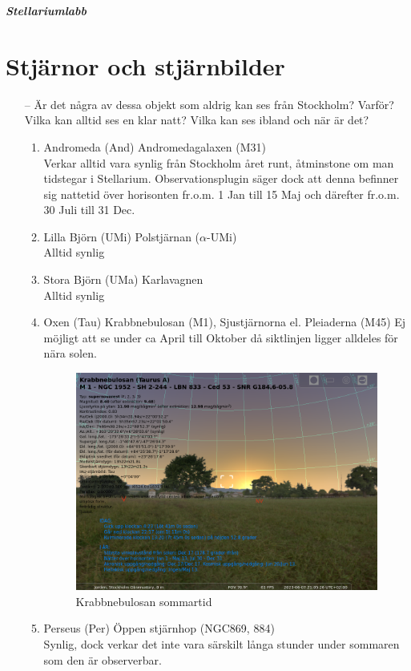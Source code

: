 \documentclass[./exercises.tex]{subfiles}
\begin{document}
\textit{\textbf{Stellariumlabb  } }

\section{Stjärnor och stjärnbilder}
\begin{itemize}
    \item[--] Är det några av dessa objekt som aldrig kan ses från Stockholm? Varför? Vilka kan alltid ses en
klar natt? Vilka kan ses ibland och när är det?\\
\begin{enumerate}[label=(\alph*)]
\item Andromeda (And) Andromedagalaxen (M31)\\
Verkar alltid vara synlig från Stockholm året runt, åtminstone om man tidstegar i Stellarium.
Observationsplugin säger dock att denna befinner sig nattetid över horisonten fr.o.m. 1 Jan till
15 Maj och därefter fr.o.m. 30 Juli till 31 Dec.

\item Lilla Björn (UMi) Polstjärnan ($\alpha$-UMi)\\
Alltid synlig

\item Stora Björn (UMa) Karlavagnen\\
Alltid synlig
\item  Oxen (Tau) Krabbnebulosan (M1), Sjustjärnorna el. Pleiaderna (M45)
Ej möjligt att se under ca April till Oktober då siktlinjen ligger alldeles för nära solen.
\begin{figure}[H]
\centering
  \includegraphics[scale=0.35]{stellarium-001.png}
  \caption{Krabbnebulosan sommartid}
  \label{fig4}
\end{figure}
\item Perseus (Per) Öppen stjärnhop (NGC869, 884)\\
Synlig, dock verkar det inte vara särskilt långa stunder under sommaren som den är observerbar.


\end{enumerate}
\end{itemize}
\end{document}
